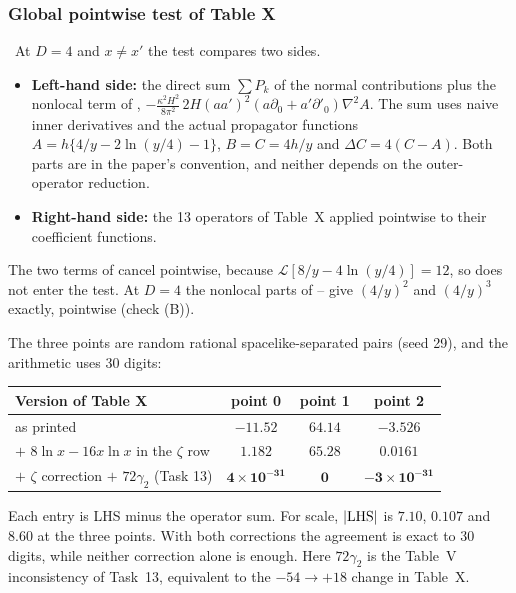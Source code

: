 \subsubsection{Global pointwise test of Table X}
\label{sec:ch08-global}
\tC\ At $D=4$ and $x\neq x'$ the test compares two sides.
\begin{itemize}[leftmargin=*,itemsep=2pt]
\item \textbf{Left-hand side:} the direct sum $\sum P_k$ of the normal contributions plus the nonlocal term of , $-\frac{\kappa^2H^2}{8\pi^2}\,2H(aa')^2(a\partial_0+a'\partial'_0)\nabla^2A$.
The sum uses naive inner derivatives and the actual propagator functions $A=h\{4/y-2\ln(y/4)-1\}$, $B=C=4h/y$ and $\Delta C=4(C-A)$.
Both parts are in the paper's convention, and neither depends on the outer-operator reduction.
\item \textbf{Right-hand side:} the 13 operators of Table~X applied pointwise to their coefficient functions.
\end{itemize}
The two terms of  cancel pointwise, because $\mathcal L[8/y-4\ln(y/4)]=12$, so  does not enter the test.
At $D=4$ the nonlocal parts of -- give $(4/y)^2$ and $(4/y)^3$ exactly, pointwise (check (B)).

The three points are random rational spacelike-separated pairs (seed 29), and the arithmetic uses 30 digits:
\begin{center}\small
\renewcommand{\arraystretch}{1.3}
\begin{tabular}{lccc}
\toprule
Version of Table X & point 0 & point 1 & point 2 \\
\midrule
as printed & $-11.52$ & $64.14$ & $-3.526$ \\
$+$ $8\ln x-16x\ln x$ in the $\zeta$ row & $1.182$ & $65.28$ & $0.0161$ \\
$+$ $\zeta$ correction $+$ $72\gamma_2$ (Task 13) & $\mathbf{4\times10^{-31}}$ & $\mathbf{0}$ & $\mathbf{-3\times10^{-31}}$ \\
\bottomrule
\end{tabular}
\end{center}
Each entry is LHS minus the operator sum. For scale, $|{\rm LHS}|$ is $7.10$, $0.107$ and $8.60$ at the three points.
With both corrections the agreement is exact to 30 digits, while neither correction alone is enough.
Here $72\gamma_2$ is the Table~V inconsistency of Task~13, equivalent to the $-54\to+18$ change in Table~X.

